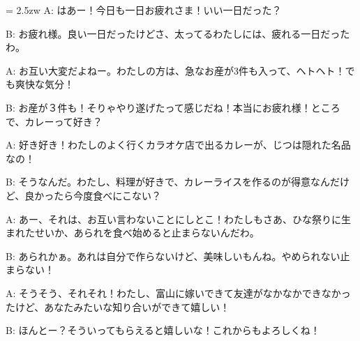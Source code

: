 \documentclass[11pt]{amsart}
\title{}
\author{}
\newenvironment{hangall}[1]{\hangindent = 2.5zw\everypar{\hangindent = 2.5zw}}{}
\begin{document}
\maketitle
\begin{hangall}{}%
A: はあー！今日も一日お疲れさま！いい一日だった？



B: お疲れ様。良い一日だったけどさ、太ってるわたしには、疲れる一日だったわ。



A: お互い大変だよねー。わたしの方は、急なお産が3件も入って、ヘトヘト！でも爽快な気分！



B: お産が３件も！そりゃやり遂げたって感じだね！本当にお疲れ様！ところで、カレーって好き？



A: 好き好き！わたしのよく行くカラオケ店で出るカレーが、じつは隠れた名品なの！



B: そうなんだ。わたし、料理が好きで、カレーライスを作るのが得意なんだけど、良かったら今度食べにこない？



A: あー、それは、お互い言わないことにしとこ！わたしもさあ、ひな祭りに生まれたせいか、あられを食べ始めると止まらないんだわ。



B: あられかぁ。あれは自分で作らないけど、美味しいもんね。やめられない止まらない！



A: そうそう、それそれ！わたし、富山に嫁いできて友達がなかなかできなかったけど、あなたみたいな知り合いができて嬉しい！



B: ほんとー？そういってもらえると嬉しいな！これからもよろしくね！\end{hangall}
\end{document}
